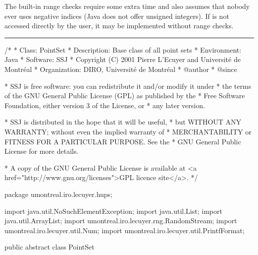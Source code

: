 \begin{detailed}  %
The built-in range checks require some extra time and also
assumes that nobody ever uses negative indices (Java does not offer unsigned
integers).  If  is not accessed directly by the user,
it may be implemented without range checks.
\end{detailed}  %

\bigskip\hrule\bigskip

\begin{code}
\begin{hide}
/*
 * Class:        PointSet
 * Description:  Base class of all point sets
 * Environment:  Java
 * Software:     SSJ 
 * Copyright (C) 2001  Pierre L'Ecuyer and Université de Montréal
 * Organization: DIRO, Université de Montréal
 * @author       
 * @since

 * SSJ is free software: you can redistribute it and/or modify it under
 * the terms of the GNU General Public License (GPL) as published by the
 * Free Software Foundation, either version 3 of the License, or
 * any later version.

 * SSJ is distributed in the hope that it will be useful,
 * but WITHOUT ANY WARRANTY; without even the implied warranty of
 * MERCHANTABILITY or FITNESS FOR A PARTICULAR PURPOSE.  See the
 * GNU General Public License for more details.

 * A copy of the GNU General Public License is available at
   <a href="http://www.gnu.org/licenses">GPL licence site</a>.
 */
\end{hide}
package umontreal.iro.lecuyer.hups;\begin{hide}

import java.util.NoSuchElementException;
import java.util.List;
import java.util.ArrayList;
import umontreal.iro.lecuyer.rng.RandomStream;
import umontreal.iro.lecuyer.util.Num;
import umontreal.iro.lecuyer.util.PrintfFormat;
\end{hide}

public abstract class PointSet \begin{hide} {

   // The maximum number of usable bits (binary digits).
   // Since Java has no unsigned type, the
   // 32nd bit cannot be used efficiently. This mainly affects digit
   // scrambling and bit vectors. This also limits the maximum number
   // of columns for the generating matrices of digital nets in base 2.
   protected static final int MAXBITS = 31;
   // To avoid 0 for nextCoordinate when random shifting 
   protected double EpsilonHalf = 1.0 / Num.TWOEXP[55];  // 1/2^55

   protected int dim = 0;
   protected int numPoints = 0;
   protected int dimShift = 0;            // Current dimension of the shift.
   protected int capacityShift = 0;       // Number of array elements of shift;
                                          // it is always >= dimShift
   protected RandomStream shiftStream;    // Used to generate random shifts.
\end{hide}
\end{code}

